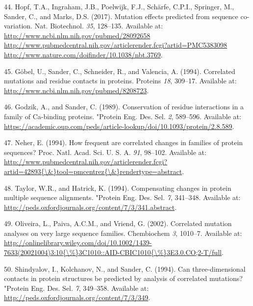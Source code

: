 \documentclass[11pt,a4paper,twoside]{book}
\theoremstyle{definition}
\theoremstyle{definition}
\theoremstyle{remark}
\begin{document}
\hypertarget{ref-Hopf2017}{}
44. Hopf, T.A., Ingraham, J.B., Poelwijk, F.J., Schärfe, C.P.I.,
Springer, M., Sander, C., and Marks, D.S. (2017). Mutation effects
predicted from sequence co-variation. Nat. Biotechnol. \emph{35},
128--135. Available at:
\href{http://www.ncbi.nlm.nih.gov/pubmed/28092658\%20http://www.pubmedcentral.nih.gov/articlerender.fcgi?artid=PMC5383098\%20http://www.nature.com/doifinder/10.1038/nbt.3769}{http://www.ncbi.nlm.nih.gov/pubmed/28092658 http://www.pubmedcentral.nih.gov/articlerender.fcgi?artid=PMC5383098 http://www.nature.com/doifinder/10.1038/nbt.3769}.

\hypertarget{ref-Gobel1994}{}
45. Göbel, U., Sander, C., Schneider, R., and Valencia, A. (1994).
Correlated mutations and residue contacts in proteins. Proteins
\emph{18}, 309--17. Available at:
\url{http://www.ncbi.nlm.nih.gov/pubmed/8208723}.

\hypertarget{ref-Godzik1989}{}
46. Godzik, A., and Sander, C. (1989). Conservation of residue
interactions in a family of Ca-binding proteins. "Protein Eng. Des. Sel.
\emph{2}, 589--596. Available at:
\url{https://academic.oup.com/peds/article-lookup/doi/10.1093/protein/2.8.589}.

\hypertarget{ref-Neher1994}{}
47. Neher, E. (1994). How frequent are correlated changes in families of
protein sequences? Proc. Natl. Acad. Sci. U. S. A. \emph{91}, 98--102.
Available at:
\href{http://www.pubmedcentral.nih.gov/articlerender.fcgi?artid=42893\%7B/\&\%7Dtool=pmcentrez\%7B/\&\%7Drendertype=abstract}{http://www.pubmedcentral.nih.gov/articlerender.fcgi?artid=42893\{\textbackslash{}\&\}tool=pmcentrez\{\textbackslash{}\&\}rendertype=abstract}.

\hypertarget{ref-Taylor1994}{}
48. Taylor, W.R., and Hatrick, K. (1994). Compensating changes in
protein multiple sequence alignments. "Protein Eng. Des. Sel. \emph{7},
341--348. Available at:
\url{http://peds.oxfordjournals.org/content/7/3/341.abstract}.

\hypertarget{ref-Oliveira2002}{}
49. Oliveira, L., Paiva, A.C.M., and Vriend, G. (2002). Correlated
mutation analyses on very large sequence families. Chembiochem \emph{3},
1010--7. Available at:
\href{http://onlinelibrary.wiley.com/doi/10.1002/1439-7633(20021004)3:10\%7B/\%\%7D3C1010::AID-CBIC1010\%7B/\%\%7D3E3.0.CO;2-T/full}{http://onlinelibrary.wiley.com/doi/10.1002/1439-7633(20021004)3:10\{\textbackslash{}\%\}3C1010::AID-CBIC1010\{\textbackslash{}\%\}3E3.0.CO;2-T/full}.

\hypertarget{ref-Shindyalov1994}{}
50. Shindyalov, I., Kolchanov, N., and Sander, C. (1994). Can
three-dimensional contacts in protein structures be predicted by
analysis of correlated mutations? "Protein Eng. Des. Sel. \emph{7},
349--358. Available at:
\url{http://peds.oxfordjournals.org/content/7/3/349}.
\end{document}
